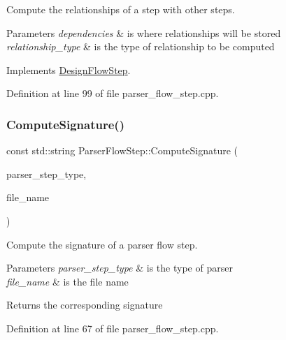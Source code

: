 Compute the relationships of a step with other steps. 


\begin{DoxyParams}{Parameters}
{\em dependencies} & is where relationships will be stored \\
\hline
{\em relationship\+\_\+type} & is the type of relationship to be computed \\
\hline
\end{DoxyParams}


Implements \hyperlink{classDesignFlowStep_a65bf7bcb603189a7ddcf930c3a9fd7fe}{Design\+Flow\+Step}.



Definition at line 99 of file parser\+\_\+flow\+\_\+step.\+cpp.

\mbox{\label{classParserFlowStep_ae74f45035340d133b9bddad49ca18653}} 
\subsubsection{\texorpdfstring{Compute\+Signature()}{ComputeSignature()}}
{\footnotesize\ttfamily const std\+::string Parser\+Flow\+Step\+::\+Compute\+Signature (\begin{DoxyParamCaption}\item[{const \hyperlink{parser__flow__step_8hpp_a8e093a5d7a60426e90f01aa6e6a1aa6a}{Parser\+Flow\+Step\+\_\+\+Type}}]{parser\+\_\+step\+\_\+type,  }\item[{const std\+::string \&}]{file\+\_\+name }\end{DoxyParamCaption})\hspace{0.3cm}{\ttfamily [static]}}



Compute the signature of a parser flow step. 


\begin{DoxyParams}{Parameters}
{\em parser\+\_\+step\+\_\+type} & is the type of parser \\
\hline
{\em file\+\_\+name} & is the file name \\
\hline
\end{DoxyParams}
\begin{DoxyReturn}{Returns}
the corresponding signature 
\end{DoxyReturn}


Definition at line 67 of file parser\+\_\+flow\+\_\+step.\+cpp.



